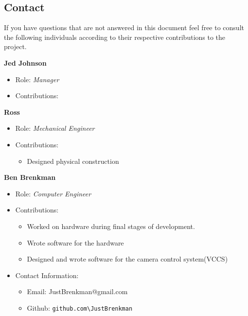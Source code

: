 \subsection*{Contact}
If you have questions that are not answered in this document feel free to consult the following individuals according to their respective contributions to the project.
\par \textbf{Jed Johnson}
\begin{itemize}
    \item[] Role: \emph{Manager}
    \item[] Contributions:
\end{itemize}
\par \textbf{Ross}
\begin{itemize}
    \item[] Role: \emph{Mechanical Engineer}
    \item[] Contributions:
    \begin{itemize}
        \item Designed physical construction
    \end{itemize} 
\end{itemize}
\par \textbf{Ben Brenkman}
\begin{itemize}
    \item[] Role: \emph{Computer Engineer}
    \item[] Contributions:
    \begin{itemize}
        \item Worked on hardware during final stages of development. 
        \item Wrote software for the hardware
        \item Designed and wrote software for the camera control system(VCCS)
    \end{itemize} 
    \item[] Contact Information:
    \begin{itemize}
        \item[] Email: JustBrenkman@gmail.com
        \item[] Github: \verb|github.com\JustBrenkman|
    \end{itemize} 
\end{itemize}